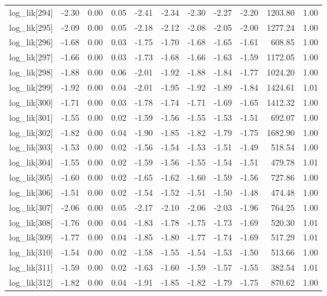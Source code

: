\begin{table}[ht]
\begin{tabular}{rrrrrrrrrrr}
  log\_lik[294] & -2.30 & 0.00 & 0.05 & -2.41 & -2.34 & -2.30 & -2.27 & -2.20 & 1203.80 & 1.00 \\ 
  log\_lik[295] & -2.09 & 0.00 & 0.05 & -2.18 & -2.12 & -2.08 & -2.05 & -2.00 & 1277.24 & 1.00 \\ 
  log\_lik[296] & -1.68 & 0.00 & 0.03 & -1.75 & -1.70 & -1.68 & -1.65 & -1.61 & 608.85 & 1.00 \\ 
  log\_lik[297] & -1.66 & 0.00 & 0.03 & -1.73 & -1.68 & -1.66 & -1.63 & -1.59 & 1172.05 & 1.00 \\ 
  log\_lik[298] & -1.88 & 0.00 & 0.06 & -2.01 & -1.92 & -1.88 & -1.84 & -1.77 & 1024.20 & 1.00 \\ 
  log\_lik[299] & -1.92 & 0.00 & 0.04 & -2.01 & -1.95 & -1.92 & -1.89 & -1.84 & 1424.61 & 1.01 \\ 
  log\_lik[300] & -1.71 & 0.00 & 0.03 & -1.78 & -1.74 & -1.71 & -1.69 & -1.65 & 1412.32 & 1.00 \\ 
  log\_lik[301] & -1.55 & 0.00 & 0.02 & -1.59 & -1.56 & -1.55 & -1.53 & -1.51 & 692.07 & 1.00 \\ 
  log\_lik[302] & -1.82 & 0.00 & 0.04 & -1.90 & -1.85 & -1.82 & -1.79 & -1.75 & 1682.90 & 1.00 \\ 
  log\_lik[303] & -1.53 & 0.00 & 0.02 & -1.56 & -1.54 & -1.53 & -1.51 & -1.49 & 518.54 & 1.00 \\ 
  log\_lik[304] & -1.55 & 0.00 & 0.02 & -1.59 & -1.56 & -1.55 & -1.54 & -1.51 & 479.78 & 1.01 \\ 
  log\_lik[305] & -1.60 & 0.00 & 0.02 & -1.65 & -1.62 & -1.60 & -1.59 & -1.56 & 727.86 & 1.00 \\ 
  log\_lik[306] & -1.51 & 0.00 & 0.02 & -1.54 & -1.52 & -1.51 & -1.50 & -1.48 & 474.48 & 1.00 \\ 
  log\_lik[307] & -2.06 & 0.00 & 0.05 & -2.17 & -2.10 & -2.06 & -2.03 & -1.96 & 764.25 & 1.00 \\ 
  log\_lik[308] & -1.76 & 0.00 & 0.04 & -1.83 & -1.78 & -1.75 & -1.73 & -1.69 & 520.30 & 1.01 \\ 
  log\_lik[309] & -1.77 & 0.00 & 0.04 & -1.85 & -1.80 & -1.77 & -1.74 & -1.69 & 517.29 & 1.01 \\ 
  log\_lik[310] & -1.54 & 0.00 & 0.02 & -1.58 & -1.55 & -1.54 & -1.53 & -1.50 & 513.66 & 1.00 \\ 
  log\_lik[311] & -1.59 & 0.00 & 0.02 & -1.63 & -1.60 & -1.59 & -1.57 & -1.55 & 382.54 & 1.01 \\ 
  log\_lik[312] & -1.82 & 0.00 & 0.04 & -1.91 & -1.85 & -1.82 & -1.79 & -1.75 & 870.62 & 1.00 \\ 

\end{tabular}
\end{table}
